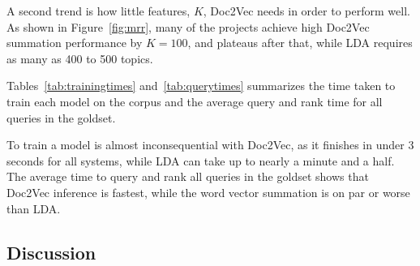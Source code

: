 A second trend is how little features, $K$, Doc2Vec needs in order to perform
well. As shown in Figure~\ref{fig:mrr}, many of the projects achieve high
Doc2Vec summation performance by $K=100$, and plateaus after that, while LDA
requires as many as 400 to 500 topics.


Tables~\ref{tab:trainingtimes} and~\ref{tab:querytimes} summarizes the time taken
to train each model on the corpus and the average query and rank time for all
queries in the goldset.

To train a model is almost inconsequential with Doc2Vec, as it finishes in under
3 seconds for all systems, while LDA can take up to nearly a minute and a half.
The average time to query and rank all queries in the goldset shows that Doc2Vec
inference is fastest, while the word vector summation is on par or worse than
LDA.


\subsection{Discussion}


